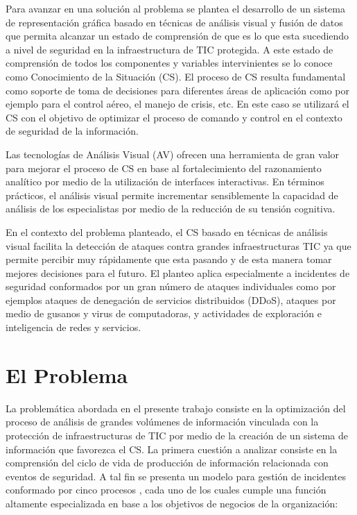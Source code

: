 \documentclass[a4paper]{./plantillas/llncs}
\begin{document}
Para avanzar en una solución al problema se plantea el desarrollo de un sistema de representación gráfica basado en técnicas de análisis visual y fusión de datos que permita alcanzar un estado de comprensión de que es lo que esta sucediendo a nivel de seguridad en la infraestructura de TIC protegida. A este estado de comprensión de todos los componentes y variables intervinientes se lo conoce como Conocimiento de la Situación (CS). El proceso de CS resulta fundamental como soporte de toma de decisiones para diferentes áreas de aplicación como por ejemplo para el control aéreo, el manejo de crisis, etc. En este caso se utilizará el CS con el objetivo de optimizar el proceso de comando y control en el contexto de seguridad de la información. 

Las tecnologías de Análisis Visual (AV) ofrecen una herramienta de gran valor para mejorar el proceso de CS en base al fortalecimiento del razonamiento analítico por medio de la utilización de interfaces interactivas. En términos prácticos, el análisis visual permite incrementar sensiblemente la capacidad de análisis de los especialistas por medio de la reducción de su tensión cognitiva. 

En el contexto del problema planteado, el CS basado en técnicas de análisis visual facilita la detección de ataques contra grandes infraestructuras TIC ya que permite percibir muy rápidamente que esta pasando y de esta manera tomar mejores decisiones para el futuro. El planteo aplica especialmente a incidentes de seguridad conformados por un gran número de ataques individuales como por ejemplos ataques de denegación de servicios distribuidos (DDoS), ataques por medio de gusanos y virus de computadoras, y actividades de exploración e inteligencia de redes y servicios.

\section{El Problema}

La  problemática abordada en el presente trabajo consiste en la optimización del proceso de análisis de grandes volúmenes de información vinculada con la protección de infraestructuras de TIC por medio de la creación de un sistema de información que favorezca el CS. La primera cuestión a analizar consiste en la comprensión del ciclo de vida de producción de información relacionada con eventos de seguridad. A tal fin se presenta un modelo para gestión de incidentes conformado por cinco procesos \cite{b1}, cada uno de los cuales cumple una función altamente especializada en base a los objetivos de negocios de la organización:
\end{document}
